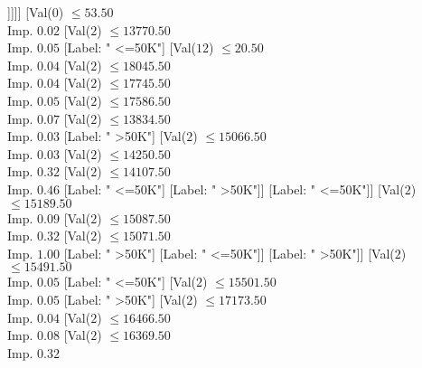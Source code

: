 \documentclass[margin=10pt]{standalone}
\begin{document}
\begin{forest}
																			[Label: " >50K"]
																			[Val($2$) $ \leq 13467.50$ \\ Imp. $0.31$
																				[Label: " <=50K"]
																				[Val($2$) $ \leq 13471.50$ \\ Imp. $0.25$
																					[Label: " <=50K"]
																					[Label: " >50K"]]]]]
																	[Val($0$) $ \leq 53.50$ \\ Imp. $0.02$
																		[Val($2$) $ \leq 13770.50$ \\ Imp. $0.05$
																			[Label: " <=50K"]
																			[Val($12$) $ \leq 20.50$ \\ Imp. $0.04$
																				[Val($2$) $ \leq 18045.50$ \\ Imp. $0.04$
																					[Val($2$) $ \leq 17745.50$ \\ Imp. $0.05$
																						[Val($2$) $ \leq 17586.50$ \\ Imp. $0.07$
																							[Val($2$) $ \leq 13834.50$ \\ Imp. $0.03$
																								[Label: " >50K"]
																								[Val($2$) $ \leq 15066.50$ \\ Imp. $0.03$
																									[Val($2$) $ \leq 14250.50$ \\ Imp. $0.32$
																										[Val($2$) $ \leq 14107.50$ \\ Imp. $0.46$
																											[Label: " <=50K"]
																											[Label: " >50K"]]
																										[Label: " <=50K"]]
																									[Val($2$) $ \leq 15189.50$ \\ Imp. $0.09$
																										[Val($2$) $ \leq 15087.50$ \\ Imp. $0.32$
																											[Val($2$) $ \leq 15071.50$ \\ Imp. $1.00$
																												[Label: " >50K"]
																												[Label: " <=50K"]]
																											[Label: " >50K"]]
																										[Val($2$) $ \leq 15491.50$ \\ Imp. $0.05$
																											[Label: " <=50K"]
																											[Val($2$) $ \leq 15501.50$ \\ Imp. $0.05$
																												[Label: " >50K"]
																												[Val($2$) $ \leq 17173.50$ \\ Imp. $0.04$
																													[Val($2$) $ \leq 16466.50$ \\ Imp. $0.08$
																														[Val($2$) $ \leq 16369.50$ \\ Imp. $0.32$

\end{forest}
\end{document}
